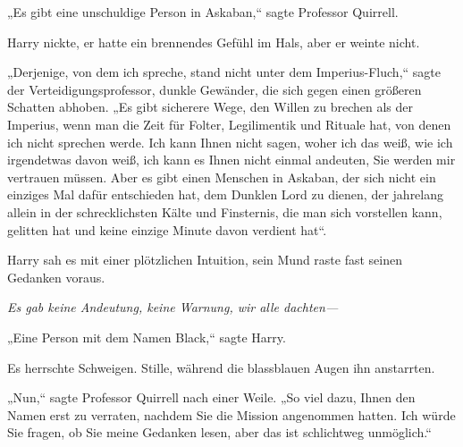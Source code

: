 „Es gibt eine unschuldige Person in Askaban,“ sagte Professor Quirrell.

Harry nickte, er hatte ein brennendes Gefühl im Hals, aber er weinte nicht.

„Derjenige, von dem ich spreche, stand nicht unter dem Imperius-Fluch,“ sagte der Verteidigungsprofessor, dunkle Gewänder, die sich gegen einen größeren Schatten abhoben. „Es gibt sicherere Wege, den Willen zu brechen als der Imperius, wenn man die Zeit für Folter, Legilimentik und Rituale hat, von denen ich nicht sprechen werde. Ich kann Ihnen nicht sagen, woher ich das weiß, wie ich irgendetwas davon weiß, ich kann es Ihnen nicht einmal andeuten, Sie werden mir vertrauen müssen. Aber es gibt einen Menschen in Askaban, der sich nicht ein einziges Mal dafür entschieden hat, dem Dunklen Lord zu dienen, der jahrelang allein in der schrecklichsten Kälte und Finsternis, die man sich vorstellen kann, gelitten hat und keine einzige Minute davon verdient hat“.

Harry sah es mit einer plötzlichen Intuition, sein Mund raste fast seinen Gedanken voraus.

\emph{Es gab keine Andeutung, keine Warnung, wir alle dachten—}

„Eine Person mit dem Namen Black,“ sagte Harry.

Es herrschte Schweigen. Stille, während die blassblauen Augen ihn anstarrten.

„Nun,“ sagte Professor Quirrell nach einer Weile. „So viel dazu, Ihnen den Namen erst zu verraten, nachdem Sie die Mission angenommen hatten. Ich würde Sie fragen, ob Sie meine Gedanken lesen, aber das ist schlichtweg unmöglich.“

